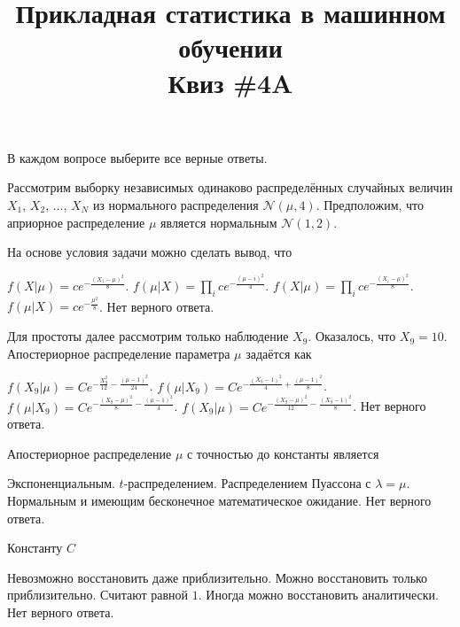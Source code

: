 \documentclass[10pt, a4paper]{exam}
\title{{\normalsize Прикладная статистика в машинном обучении} \\ \vspace{0.5em} Квиз \#4A}
\author{\rule{15cm}{0.4pt}}
\begin{document}
	
	\maketitle
	
	\begin{center}
		В каждом вопросе выберите все верные ответы.
	\end{center}
	
	Рассмотрим выборку независимых одинаково распределённых случайных величин $X_1$, $X_2$, $\ldots$, $X_N$ из нормального распределения $\mathcal{N}(\mu, 4)$. Предположим, что априорное распределение $\mu$ является нормальным $\mathcal{N}(1, 2)$.
	
	\begin{questions}
		\question На основе условия задачи можно сделать вывод, что
		\begin{choices}
			\choice $f(X | \mu) = ce^{-\frac{(X_1 - \mu)^2}{8}}$.
			\choice $f(\mu | X) = \prod_i ce^{-\frac{(\mu - i)^2}{4}}$.
			\choice $f(X | \mu) = \prod_i ce^{-\frac{(X_i - \mu)^2}{8}}$.
			\choice $f(\mu | X) = ce^{-\frac{\mu^2}{8}}$.
			\choice Нет верного ответа.
		\end{choices}
	
		\question Для простоты далее рассмотрим только наблюдение $X_9$. Оказалось, что $X_9 = 10$. Апостериорное распределение параметра $\mu$ задаётся как
		\begin{choices}
			\choice $f(X_9 | \mu) = Ce^{-\frac{X_9^2}{12} - \frac{(\mu - 1)^2}{24}}$.
			\choice$f(\mu | X_{9}) = Ce^{-\frac{(X_9 - 1)^2}{4} + \frac{(\mu - 1)^2}{8}}$.
			\choice $f(\mu | X_{9}) = Ce^{-\frac{(X_9 - \mu)^2}{8} - \frac{(\mu - 1)^2}{4}}$.
			\choice $f(X_9 | \mu) = Ce^{-\frac{(X_9 - \mu)^2}{12} - \frac{(X_9 - 1)^2}{8}}$.
			\choice Нет верного ответа.
		\end{choices}
	
		\question Апостериорное распределение $\mu$ с точностью до константы является 
		\begin{choices}
			\choice Экспоненциальным.
			\choice $t$-распределением.
			\choice Распределением Пуассона с $\lambda = \mu$.
			\choice Нормальным и имеющим бесконечное математическое ожидание.
			\choice Нет верного ответа.
		\end{choices}
		
		\question Константу $C$
		\begin{choices}
			\choice Невозможно восстановить даже приблизительно.
			\choice Можно восстановить только приблизительно.
			\choice Считают равной $1$.
			\choice Иногда можно восстановить аналитически.
			\choice Нет верного ответа.
		\end{choices}
	

\end{questions}
\end{document}
